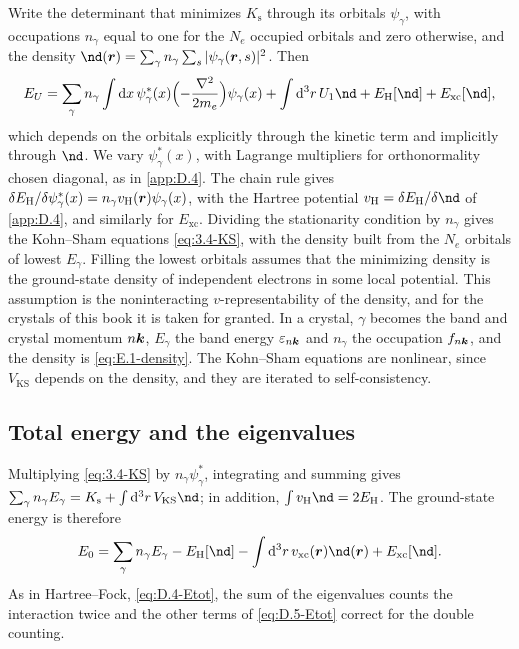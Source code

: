 Write the determinant that minimizes $K_{\mathrm{s}}$ through its orbitals $\psi_\gamma$, with occupations $n_\gamma$ equal to one for the $N_e$ occupied orbitals and zero otherwise, and the density $\nd(\vect{r}) = \sum_\gamma n_\gamma\sum_s|\psi_\gamma(\vect{r}, s)|^2$. Then
\begin{equation*}
  E_U = \sum_\gamma n_\gamma\int\dd x\,\psi^*_\gamma(x)\Bigl(-\frac{\nabla^2}{2m_e}\Bigr)\psi_\gamma(x) + \int\dd^3r\,U_1\nd + E_{\mathrm{H}}[\nd] + E_{\mathrm{xc}}[\nd] ,
\end{equation*}
which depends on the orbitals explicitly through the kinetic term and implicitly through $\nd$. We vary $\psi^*_\gamma(x)$, with Lagrange multipliers for orthonormality chosen diagonal, as in \cref{app:D.4}. The chain rule gives $\delta E_{\mathrm{H}}/\delta\psi^*_\gamma(x) = n_\gamma v_{\mathrm{H}}(\bm{r})\psi_\gamma(x)$, with the Hartree potential $v_{\mathrm{H}} = \delta E_{\mathrm{H}}/\delta\nd$ of \cref{app:D.4}, and similarly for $E_{\mathrm{xc}}$. Dividing the stationarity condition by $n_\gamma$ gives the Kohn--Sham equations \cref{eq:3.4-KS}, with the density built from the $N_e$ orbitals of lowest $E_\gamma$. Filling the lowest orbitals assumes that the minimizing density is the ground-state density of independent electrons in some local potential. This assumption is the noninteracting $v$-representability of the density, and for the crystals of this book it is taken for granted. In a crystal, $\gamma$ becomes the band and crystal momentum $n\bm{k}$, $E_\gamma$ the band energy $\varepsilon_{n\bm{k}}$ and $n_\gamma$ the occupation $f_{n\bm{k}}$, and the density is \cref{eq:E.1-density}. The Kohn--Sham equations are nonlinear, since $V_{\mathrm{KS}}$ depends on the density, and they are iterated to self-consistency.

\subsection{Total energy and the eigenvalues}

Multiplying \cref{eq:3.4-KS} by $n_\gamma\psi^*_\gamma$, integrating and summing gives $\sum_\gamma n_\gamma E_\gamma = K_{\mathrm{s}} + \int\dd^3r\,V_{\mathrm{KS}}\nd$; in addition, $\int v_{\mathrm{H}}\nd = 2E_{\mathrm{H}}$. The ground-state energy is therefore
\begin{equation}
  E_0 = \sum_\gamma n_\gamma E_\gamma - E_{\mathrm{H}}[\nd] - \int\dd^3r\,v_{\mathrm{xc}}(\vect{r})\nd(\vect{r}) + E_{\mathrm{xc}}[\nd] .
  \label{eq:D.5-Etot}
\end{equation}
As in Hartree--Fock, \cref{eq:D.4-Etot}, the sum of the eigenvalues counts the interaction twice and the other terms of \cref{eq:D.5-Etot} correct for the double counting.

